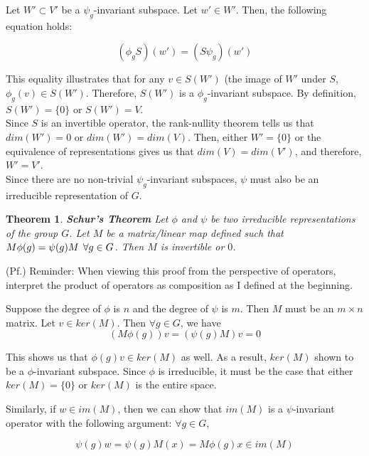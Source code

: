 \documentclass[10pt]{ucthesis}
\newtheorem{theorem}[definition]{Theorem}
\begin{document}
Let $W' \subset V'$ be a $\psi_g$-invariant subspace. Let $w' \in W'$. Then, the following equation holds:

$$(\phi_gS)(w') = (S\psi_g)(w')$$

This equality illustrates that for any $v \in S(W')$ (the image of $W'$ under $S$, $\phi_g (v) \in S(W')$. Therefore, $S(W')$ is a $\phi_g$-invariant subspace. By definition, $S(W') = \{0\}$ or $S(W') = V$. \\

Since $S$ is an invertible operator, the rank-nullity theorem tells us that $dim(W')=0$ or $dim(W') = dim(V)$. Then, either $W' = \{0\}$ or the equivalence of representations gives us that $dim(V)=dim(V')$, and therefore, $W' = V'$. \\

Since there are no non-trivial $\psi_g$-invariant subspaces, $\psi$ must also be an irreducible representation of $G$. \qedsymbol



\begin{theorem} \textbf{Schur's Theorem}
	Let $\phi$ and $\psi$ be two irreducible representations of the group $G$. Let $M$ be a matrix/linear map defined such that $M\phi(g) = \psi(g)M \hspace{1.5mm}\forall g \in G$. Then $M$ is invertible or $0$. 
\end{theorem}

\noindent (Pf.) Reminder: When viewing this proof from the perspective of operators, interpret the product of operators as composition as I defined at the beginning. 

Suppose the degree of $\phi$ is $n$ and the degree of $\psi$ is $m$. Then $M$ must be an $m\times n$ matrix. Let $v\in ker(M)$. Then $\forall g \in G$, we have 
\begin{equation}
	 (M\phi(g))v= (\psi(g)M)v = 0
\end{equation}

This shows us that $\phi(g)v \in ker(M)$ as well. As a result, $ker(M)$ shown to be a $\phi$-invariant subspace. Since $\phi$ is irreducible, it must be the case that either $ker(M) =\{0\}$ or $ker(M)$ is the entire space.  

Similarly, if $w \in im(M)$, then we can show that $im(M)$ is a $\psi$-invariant operator with the following argument: $\forall g\in G$,

\begin{equation}
	\psi(g)w =\psi(g)M(x) = M\phi(g)x \in im(M)
\end{equation}
\end{document}

